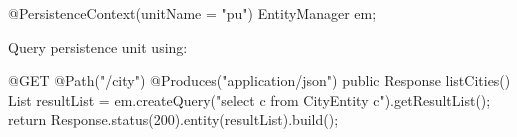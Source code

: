 \begin{javacode}
@PersistenceContext(unitName = "pu")
EntityManager em;
\end{javacode}

Query persistence unit using:

\begin{javacode}
@GET
@Path("/city")
@Produces("application/json")
public Response listCities() {
   	List resultList = em.createQuery("select c from CityEntity c").getResultList();
   	return Response.status(200).entity(resultList).build();
}
\end{javacode}
